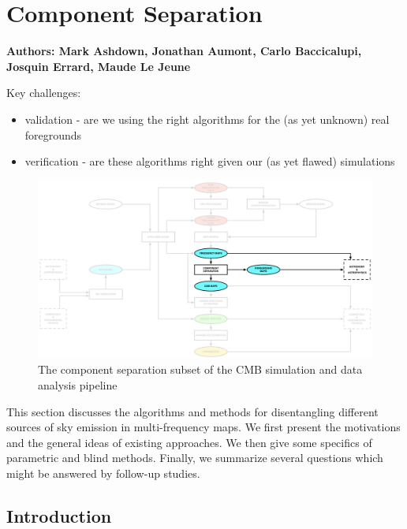           
\section{Component Separation}
\label{sec:compsep}

\textbf{ Authors: Mark Ashdown, Jonathan Aumont, Carlo Baccicalupi, Josquin Errard, Maude Le Jeune}

Key challenges:
\begin{itemize}
\item validation - are we using the right algorithms for the (as yet unknown) real foregrounds
\item verification - are these algorithms right given our (as yet flawed) simulations
\end{itemize}

\begin{figure}[htbp]
\centering
\includegraphics[width=1\textwidth]{Analysis/cs}
\caption{The component separation subset of the CMB simulation and data analysis pipeline}
\label{fig:general_comp_sep_scheme}
\end{figure}

This section discusses the algorithms and methods for disentangling different sources of sky emission in multi-frequency maps. 
We first present the motivations and the general ideas of existing approaches. 
We then give some specifics of parametric and blind methods. 
Finally, we summarize several questions which might be answered by follow-up studies.

\subsection{Introduction}

